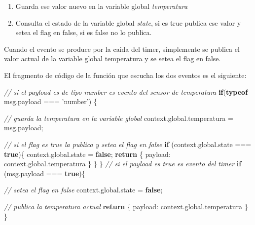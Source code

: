 \documentclass[11pt]{article}
\newenvironment{Shaded}{}{}
\newcommand{\KeywordTok}[1]{\textcolor[rgb]{0.00,0.44,0.13}{\textbf{{#1}}}}
\newcommand{\DataTypeTok}[1]{\textcolor[rgb]{0.56,0.13,0.00}{{#1}}}
\newcommand{\StringTok}[1]{\textcolor[rgb]{0.25,0.44,0.63}{{#1}}}
\newcommand{\CommentTok}[1]{\textcolor[rgb]{0.38,0.63,0.69}{\textit{{#1}}}}
\newcommand{\NormalTok}[1]{{#1}}
\newcommand{\VariableTok}[1]{\textcolor[rgb]{0.10,0.09,0.49}{{#1}}}
\newcommand{\ControlFlowTok}[1]{\textcolor[rgb]{0.00,0.44,0.13}{\textbf{{#1}}}}
\newcommand{\OperatorTok}[1]{\textcolor[rgb]{0.40,0.40,0.40}{{#1}}}
\newcommand{\AttributeTok}[1]{\textcolor[rgb]{0.49,0.56,0.16}{{#1}}}
\begin{document}
\begin{enumerate}
\def\labelenumi{\arabic{enumi})}
\item
  Guarda ese valor nuevo en la variable global \emph{temperatura}
\item
  Consulta el estado de la variable global \emph{state}, si es true
  publica ese valor y setea el flag en false, si es false no lo publica.
\end{enumerate}

Cuando el evento se produce por la caida del timer, simplemente se
publica el valor actual de la variable global temperatura y se setea el
flag en false.

El fragmento de código de la función que escucha los dos eventos es el
siguiente:

\begin{Shaded}
\begin{Highlighting}[]
\CommentTok{// si el payload es de tipo number es evento del sensor de temperatura}
\ControlFlowTok{if}\NormalTok{(}\KeywordTok{typeof} \VariableTok{msg}\NormalTok{.}\AttributeTok{payload} \OperatorTok{===} \StringTok{'number'}\NormalTok{) }\OperatorTok{\{}
    
    \CommentTok{// guarda la temperatura en la variable global}
    \VariableTok{context}\NormalTok{.}\VariableTok{global}\NormalTok{.}\AttributeTok{temperatura} \OperatorTok{=} \VariableTok{msg}\NormalTok{.}\AttributeTok{payload}\OperatorTok{;}
    
    \CommentTok{// si el flag es true la publica y setea el flag en false}
    \ControlFlowTok{if}\NormalTok{ (}\VariableTok{context}\NormalTok{.}\VariableTok{global}\NormalTok{.}\AttributeTok{state} \OperatorTok{===} \KeywordTok{true}\NormalTok{)}\OperatorTok{\{}
        \VariableTok{context}\NormalTok{.}\VariableTok{global}\NormalTok{.}\AttributeTok{state} \OperatorTok{=} \KeywordTok{false}\OperatorTok{;}
        \ControlFlowTok{return} \OperatorTok{\{}
            \DataTypeTok{payload}\OperatorTok{:} \VariableTok{context}\NormalTok{.}\VariableTok{global}\NormalTok{.}\AttributeTok{temperatura}
        \OperatorTok{\}}    
    \OperatorTok{\}}
\OperatorTok{\}}
\CommentTok{// si el payload es true es evento del timer}
\ControlFlowTok{if}\NormalTok{ (}\VariableTok{msg}\NormalTok{.}\AttributeTok{payload} \OperatorTok{===} \KeywordTok{true}\NormalTok{)}\OperatorTok{\{}
    
    \CommentTok{// setea el flag en false }
    \VariableTok{context}\NormalTok{.}\VariableTok{global}\NormalTok{.}\AttributeTok{state} \OperatorTok{=} \KeywordTok{false}\OperatorTok{;}
    
    \CommentTok{// publica la temperatura actual}
    \ControlFlowTok{return} \OperatorTok{\{}
        \DataTypeTok{payload}\OperatorTok{:} \VariableTok{context}\NormalTok{.}\VariableTok{global}\NormalTok{.}\AttributeTok{temperatura}
    \OperatorTok{\}}     
\OperatorTok{\}}
\end{Highlighting}
\end{Shaded}
\end{document}
